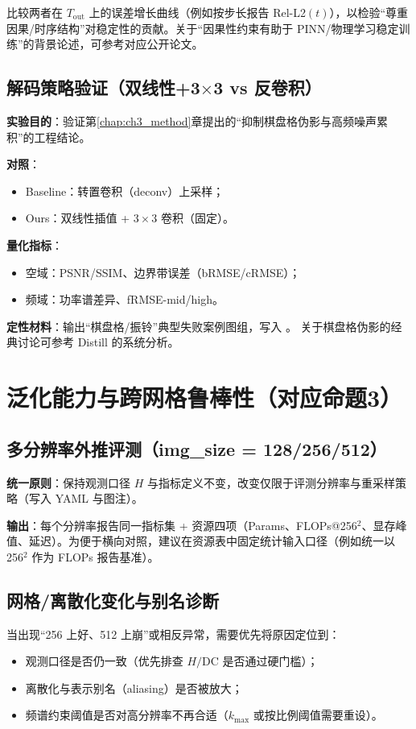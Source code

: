 比较两者在 $T_{\mathrm{out}}$ 上的误差增长曲线（例如按步长报告 Rel-L2$(t)$），以检验“尊重因果/时序结构”对稳定性的贡献。关于“因果性约束有助于 PINN/物理学习稳定训练”的背景论述，可参考对应公开论文\cite{wang2022causality_pinn}。

\subsection{解码策略验证（双线性+3\texorpdfstring{$\times$}{x}3 vs 反卷积）}
\textbf{实验目的}：验证第\ref{chap:ch3_method}章提出的“抑制棋盘格伪影与高频噪声累积”的工程结论。

\textbf{对照}：
\begin{itemize}
  \item Baseline：转置卷积（deconv）上采样；
  \item Ours：双线性插值 + $3\times3$ 卷积（固定）。
\end{itemize}

\textbf{量化指标}：
\begin{itemize}
  \item 空域：PSNR/SSIM、边界带误差（bRMSE/cRMSE）；
  \item 频域：功率谱差异、fRMSE-mid/high。
\end{itemize}

\textbf{定性材料}：输出“棋盘格/振铃”典型失败案例图组，写入
。
关于棋盘格伪影的经典讨论可参考 Distill 的系统分析\cite{odena2016checkerboard}。

\section{泛化能力与跨网格鲁棒性（对应命题3）}

\subsection{多分辨率外推评测（img\_size = 128/256/512）}
\textbf{统一原则}：保持观测口径 $H$ 与指标定义不变，改变仅限于评测分辨率与重采样策略（写入 YAML 与图注）。

\textbf{输出}：每个分辨率报告同一指标集 + 资源四项（Params、FLOPs@256$^2$、显存峰值、延迟）。为便于横向对照，建议在资源表中固定统计输入口径（例如统一以 256$^2$ 作为 FLOPs 报告基准）。

\subsection{网格/离散化变化与别名诊断}
当出现“256 上好、512 上崩”或相反异常，需要优先将原因定位到：
\begin{itemize}
  \item 观测口径是否仍一致（优先排查 $H/\mathrm{DC}$ 是否通过硬门槛）；
  \item 离散化与表示别名（aliasing）是否被放大；
  \item 频谱约束阈值是否对高分辨率不再合适（$k_{\max}$ 或按比例阈值需要重设）。
\end{itemize}

